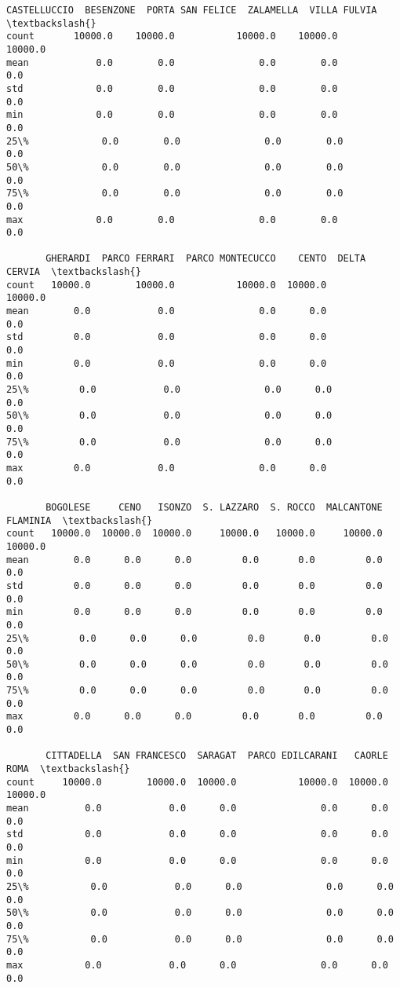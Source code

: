 \documentclass[11pt]{article}
\makeatletter
\newcommand{\boxspacing}{\kern\kvtcb@left@rule\kern\kvtcb@boxsep}
\newcommand{\prompt}[4]{
        {\ttfamily\llap{{\color{#2}[#3]:\hspace{3pt}#4}}\vspace{-\baselineskip}}
    }
\makeatother
\begin{document}
            \begin{tcolorbox}[breakable, size=fbox, boxrule=.5pt, pad at break*=1mm, opacityfill=0]
\prompt{Out}{outcolor}{25}{\boxspacing}
\begin{Verbatim}[commandchars=\\\{\}]
       CASTELLUCCIO  BESENZONE  PORTA SAN FELICE  ZALAMELLA  VILLA FULVIA  \textbackslash{}
count       10000.0    10000.0           10000.0    10000.0       10000.0
mean            0.0        0.0               0.0        0.0           0.0
std             0.0        0.0               0.0        0.0           0.0
min             0.0        0.0               0.0        0.0           0.0
25\%             0.0        0.0               0.0        0.0           0.0
50\%             0.0        0.0               0.0        0.0           0.0
75\%             0.0        0.0               0.0        0.0           0.0
max             0.0        0.0               0.0        0.0           0.0

       GHERARDI  PARCO FERRARI  PARCO MONTECUCCO    CENTO  DELTA CERVIA  \textbackslash{}
count   10000.0        10000.0           10000.0  10000.0       10000.0
mean        0.0            0.0               0.0      0.0           0.0
std         0.0            0.0               0.0      0.0           0.0
min         0.0            0.0               0.0      0.0           0.0
25\%         0.0            0.0               0.0      0.0           0.0
50\%         0.0            0.0               0.0      0.0           0.0
75\%         0.0            0.0               0.0      0.0           0.0
max         0.0            0.0               0.0      0.0           0.0

       BOGOLESE     CENO   ISONZO  S. LAZZARO  S. ROCCO  MALCANTONE  FLAMINIA  \textbackslash{}
count   10000.0  10000.0  10000.0     10000.0   10000.0     10000.0   10000.0
mean        0.0      0.0      0.0         0.0       0.0         0.0       0.0
std         0.0      0.0      0.0         0.0       0.0         0.0       0.0
min         0.0      0.0      0.0         0.0       0.0         0.0       0.0
25\%         0.0      0.0      0.0         0.0       0.0         0.0       0.0
50\%         0.0      0.0      0.0         0.0       0.0         0.0       0.0
75\%         0.0      0.0      0.0         0.0       0.0         0.0       0.0
max         0.0      0.0      0.0         0.0       0.0         0.0       0.0

       CITTADELLA  SAN FRANCESCO  SARAGAT  PARCO EDILCARANI   CAORLE     ROMA  \textbackslash{}
count     10000.0        10000.0  10000.0           10000.0  10000.0  10000.0
mean          0.0            0.0      0.0               0.0      0.0      0.0
std           0.0            0.0      0.0               0.0      0.0      0.0
min           0.0            0.0      0.0               0.0      0.0      0.0
25\%           0.0            0.0      0.0               0.0      0.0      0.0
50\%           0.0            0.0      0.0               0.0      0.0      0.0
75\%           0.0            0.0      0.0               0.0      0.0      0.0
max           0.0            0.0      0.0               0.0      0.0      0.0


\end{Verbatim}
\end{tcolorbox}
\end{document}

